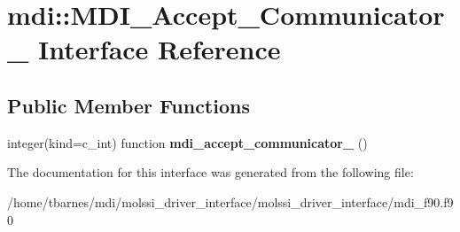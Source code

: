 \hypertarget{interfacemdi_1_1MDI__Accept__Communicator__}{\section{mdi\-:\-:M\-D\-I\-\_\-\-Accept\-\_\-\-Communicator\-\_\- Interface Reference}
\label{interfacemdi_1_1MDI__Accept__Communicator__}
}
\subsection*{Public Member Functions}
\begin{DoxyCompactItemize}
\item 
\hypertarget{interfacemdi_1_1MDI__Accept__Communicator___af692624300292e68edf192a9379e4182}{integer(kind=c\-\_\-int) function {\bfseries mdi\-\_\-accept\-\_\-communicator\-\_\-} ()}\label{interfacemdi_1_1MDI__Accept__Communicator___af692624300292e68edf192a9379e4182}

\end{DoxyCompactItemize}


The documentation for this interface was generated from the following file\-:\begin{DoxyCompactItemize}
\item 
/home/tbarnes/mdi/molssi\-\_\-driver\-\_\-interface/molssi\-\_\-driver\-\_\-interface/mdi\-\_\-f90.\-f90\end{DoxyCompactItemize}
